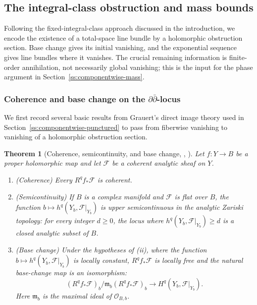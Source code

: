\documentclass[11pt]{amsart}
\numberwithin{equation}{section}
\theoremstyle{plain}
\newtheorem{thm}{Theorem}[section]
\theoremstyle{definition}
\newcommand{\cF}{\mathcal F}
\newcommand{\cO}{\mathcal O}
\begin{document}
\subsection{The integral-class obstruction and mass bounds}
\label{ss:revised-integral-obstruction}

Following the fixed-integral-class approach discussed in the
introduction, we encode the existence of a total-space line bundle by
a holomorphic obstruction section.  Base change gives its initial
vanishing, and the exponential sequence gives line bundles where it
vanishes.  The crucial remaining information is finite-order
annihilation, not necessarily global vanishing; this is the input for
the phase argument in Section~\ref{ss:componentwise-mass}.

\subsubsection{Coherence and base change on the
\texorpdfstring{$\partial\bar\partial$}{ddbar}-locus}
We first record several basic results from Grauert's direct image theory used in
Section~\ref{ss:componentwise-punctured} to pass from fiberwise
vanishing to vanishing of a holomorphic obstruction section.

\begin{thm}[Coherence, semicontinuity, and base change,
{\cite[Hauptsatz~I and \S~7, S\"atze~3 and~5]{Gr60}},
{\cite[\S~10.5.4]{GR84}}]
\label{thm:revised-grauert-tools}
Let $f:Y\to B$ be a proper holomorphic map and let $\cF$ be a coherent
analytic sheaf on $Y$.
\begin{enumerate}[$(i)$]
\item \textup{(Coherence)} Every $R^qf_*\cF$ is coherent.
\item \textup{(Semicontinuity)} If $B$ is a complex manifold and $\cF$
is flat over $B$, the function
$b\mapsto h^q(Y_b,\cF|_{Y_b})$ is upper semicontinuous in the analytic
Zariski topology: for every integer $d\ge0$, the locus where
$h^q(Y_b,\cF|_{Y_b})\ge d$ is a closed analytic subset of $B$.
\item \textup{(Base change)} Under the hypotheses of \textup{(ii)}, where
the function $b\mapsto h^q(Y_b,\cF|_{Y_b})$ is locally constant,
$R^qf_*\cF$ is locally free and the natural
base-change map is an isomorphism:
\[
 (R^qf_*\cF)_b/\mathfrak m_b(R^qf_*\cF)_b
 \longrightarrow H^q(Y_b,\cF|_{Y_b}).
\]
Here $\mathfrak m_b$ is the maximal ideal of $\cO_{B,b}$.
\end{enumerate}
\end{thm}
\end{document}
